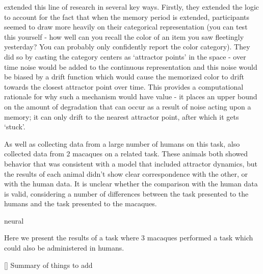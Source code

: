 \cite{panichello_error-correcting_2019} extended this line of research in several key ways. 
Firstly, they extended the logic to account for the fact that when the memory period is extended, participants seemed to draw more heavily on their categorical representation (you can test this yourself - how well can you recall the color of an item you saw fleetingly yesterday? 
You can probably only confidently report the color category). 
They did so by casting the category centers as `attractor points' in the space - over time noise would be added to the continuous representation and this noise would be biased by a drift function which would cause the memorized color to drift towards the closest attractor point over time. 
This provides a computational rationale for why such a mechanism would have value - it places an upper bound on the amount of degradation that can occur as a result of noise acting upon a memory; it can only drift to the nearest attractor point, after which it gets `stuck'.

As well as collecting data from a large number of humans on this task, \cite{panichello_error-correcting_2019} also collected data from 2 macaques on a related task. 
These animals both showed behavior that was consistent with a model that included attractor dynamics, but the results of each animal didn't show clear correspondence with the other, or with the human data.
It is unclear whether the comparison with the human data is valid, considering a number of differences between the task presented to the humans and the task presented to the macaques.

neural

Here we present the results of a task where 3 macaques performed a task which could also be administered in humans.

[]
Summary of things to add